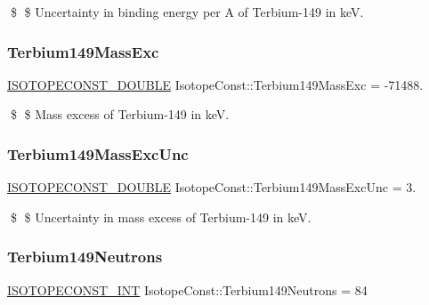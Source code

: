 \$ \$ Uncertainty in binding energy per A of Terbium-\/149 in keV. \mbox{\label{group___isotope_const-_terbium-_tb149_ga9b474c579164c772ffae2aac77b83073}} 
\subsubsection{\texorpdfstring{Terbium149\+Mass\+Exc}{Terbium149MassExc}}
{\footnotesize\ttfamily \mbox{\hyperlink{group___isotope_const-_macros_ga8f45a7272ce02c0b4c65c44636ed719a}{I\+S\+O\+T\+O\+P\+E\+C\+O\+N\+S\+T\+\_\+\+D\+O\+U\+B\+LE}} Isotope\+Const\+::\+Terbium149\+Mass\+Exc = -\/71488.}

\$ \$ Mass excess of Terbium-\/149 in keV. \mbox{\label{group___isotope_const-_terbium-_tb149_gae5df76b1262175c7e67d883fdddbdeea}} 
\subsubsection{\texorpdfstring{Terbium149\+Mass\+Exc\+Unc}{Terbium149MassExcUnc}}
{\footnotesize\ttfamily \mbox{\hyperlink{group___isotope_const-_macros_ga8f45a7272ce02c0b4c65c44636ed719a}{I\+S\+O\+T\+O\+P\+E\+C\+O\+N\+S\+T\+\_\+\+D\+O\+U\+B\+LE}} Isotope\+Const\+::\+Terbium149\+Mass\+Exc\+Unc = 3.}

\$ \$ Uncertainty in mass excess of Terbium-\/149 in keV. \mbox{\label{group___isotope_const-_terbium-_tb149_gab9f3a2b7d43120c4cc6957225080bde9}} 
\subsubsection{\texorpdfstring{Terbium149\+Neutrons}{Terbium149Neutrons}}
{\footnotesize\ttfamily \mbox{\hyperlink{group___isotope_const-_macros_ga5f18360b3e99483a35c32d789e62621c}{I\+S\+O\+T\+O\+P\+E\+C\+O\+N\+S\+T\+\_\+\+I\+NT}} Isotope\+Const\+::\+Terbium149\+Neutrons = 84}

